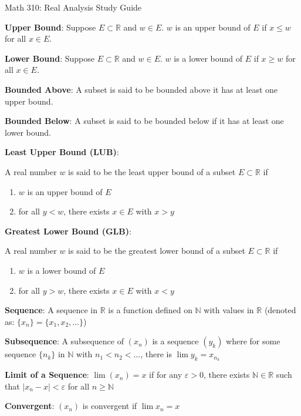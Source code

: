 \documentclass[12pt]{article}
\newcommand{\reals}{\mathbb{R}}
\newcommand{\nats}{\mathbb{N}}
\newcommand{\entry}[1]{\textbf{#1}: } %
\begin{document}

Math 310: Real Analysis Study Guide

\begin{multicols}{0}



\entry{Upper Bound}{Suppose $E \subset  \reals$ and $w \in E$. $w$ is an upper bound of $E$ if $x \leq w$ for all $x \in E$.}

\entry{Lower Bound}{Suppose $E \subset \reals$ and $w \in E$. $w$ is a lower bound of $E$ if $x \geq w$ for all $x \in E$.}

\entry{Bounded Above}{A subset is said to be bounded above it has at least one upper bound.}

\entry{Bounded Below}{A subset is said to be bounded below if it has at least one lower bound.}

\entry{Least Upper Bound (LUB)}{A real number $w$ is said to be the least upper bound of a subset $E \subset \reals$ if \begin{enumerate} 
\item $w$ is an upper bound of $E$ 
\item for all $y < w$, there exists $x \in E$ with $x > y$ \end{enumerate} }

\entry{Greatest Lower Bound (GLB)}{A real number $w$ is said to be the greatest lower bound of a subset $E \subset \reals$ if \begin{enumerate} 
\item $w$ is a lower bound of $E$
\item for all $y > w$, there exists $x \in E$ with $x < y$ \end{enumerate} }

\entry{Sequence}{A sequence in $\reals$ is a function defined on $\nats$ with values in $\reals$ (denoted as: $\{x_n\} = \{x_1, x_2, \dots\}$)}

\entry{Subsequence}{A subsequence of $(x_n)$ is a sequence $(y_k)$ where for some sequence $\{n_k\}$ in $\nats$ with $n_1 < n_2 < \dots $, there is $\lim y_k = x_{n_k}$}

\entry{Limit of a Sequence}{$\lim (x_n) = x$ if for any $\varepsilon > 0$, there exists $\nats \in \reals$ such that $|x_n - x| < \varepsilon$ for all $n \geq \nats$}

\entry{Convergent}{$(x_n)$ is convergent if $\lim x_n = x$}


\end{multicols}
\end{document}
